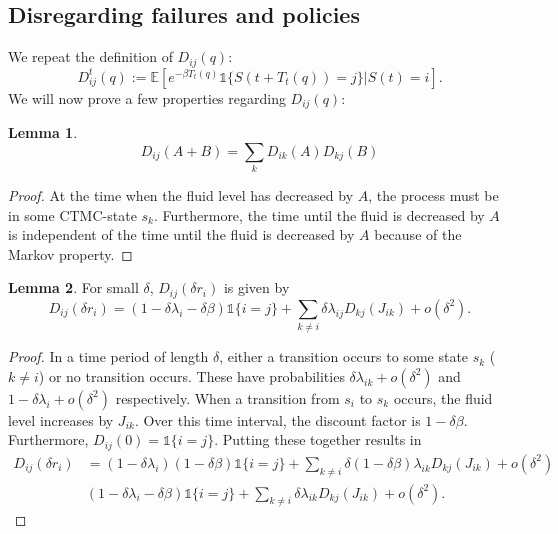 \documentclass[a4paper]{thesis}
\theoremstyle{definition}
\newtheorem{lemma}{Lemma}
\begin{document}
\subsection{Disregarding failures and policies}
We repeat the definition of $D_{ij}(q)$:
\[
D_{ij}^t(q):=\mathbb{E}[e^{-\beta T_t(q)}\mathds{1}\{S(t+T_t(q))=j\}|S(t)=i].
\]
We will now prove a few properties regarding $D_{ij}(q)$:
\begin{lemma}\label{lemma:MmfmDiscountsExponentLinear}
	\[
	D_{ij}(A+B)=\sum\limits_k D_{ik}(A)D_{kj}(B)
	\]
	\begin{proof}
		At the time when the fluid level has decreased by $A$, the process must be in some CTMC-state $s_k$.
		Furthermore, the time until the fluid is decreased by $A$ is independent of the time until the fluid is decreased by $A$ because of the Markov property.
	\end{proof}
\end{lemma}
\begin{lemma}\label{lemma:MmfmDiscountsInfinitisimal}
	For small $\delta$, $D_{ij}(\delta r_i)$ is given by
	\[
	D_{ij}(\delta r_i)=(1-\delta\lambda_i-\delta\beta)\mathds{1}\{i=j\}+\sum\limits_{k\neq i}\delta\lambda_{ij}D_{kj}(J_{ik})+o(\delta^2).
	\]
	\begin{proof}
		In a time period of length $\delta$, either a transition occurs to some state $s_k$ ($k\neq i$) or no transition occurs.
		These have probabilities $\delta\lambda_{ik}+o(\delta^2)$ and $1-\delta\lambda_i+o(\delta^2)$ respectively.
		When a transition from $s_i$ to $s_k$ occurs, the fluid level increases by $J_{ik}$.
		Over this time interval, the discount factor is $1-\delta\beta$.
		Furthermore, $D_{ij}(0)=\mathds{1}\{i=j\}$.
		Putting these together results in
		\[
		\begin{split}
		D_{ij}(\delta r_i)&=(1-\delta\lambda_i)(1-\delta\beta)\mathds{1}\{i=j\}+\sum\limits_{k\neq i}\delta(1-\delta\beta)\lambda_{ik}D_{kj}(J_{ik})+o(\delta^2)\\
		&(1-\delta\lambda_i-\delta\beta)\mathds{1}\{i=j\}+\sum\limits_{k\neq i}\delta\lambda_{ik}D_{kj}(J_{ik})+o(\delta^2).
		\end{split}
		\]
	\end{proof}
\end{lemma}
\end{document}
